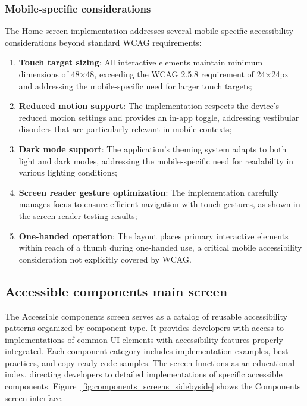 \FloatBarrier

\subsubsection{Mobile-specific considerations}

The Home screen implementation addresses several mobile-specific accessibility considerations beyond standard WCAG requirements:

\begin{enumerate}
    \item \textbf{Touch target sizing}: All interactive elements maintain minimum dimensions of 48×48, exceeding the WCAG 2.5.8 requirement of 24×24px and addressing the mobile-specific need for larger touch targets;
    \item \textbf{Reduced motion support}: The implementation respects the device's reduced motion settings and provides an in-app toggle, addressing vestibular disorders that are particularly relevant in mobile contexts;
    \item \textbf{Dark mode support}: The application's theming system adapts to both light and dark modes, addressing the mobile-specific need for readability in various lighting conditions;
    \item \textbf{Screen reader gesture optimization}: The implementation carefully manages focus to ensure efficient navigation with touch gestures, as shown in the screen reader testing results;
    \item \textbf{One-handed operation}: The layout places primary interactive elements within reach of a thumb during one-handed use, a critical mobile accessibility consideration not explicitly covered by WCAG.
\end{enumerate}

\subsection{Accessible components main screen}

The Accessible components screen serves as a catalog of reusable accessibility patterns organized by component type. It provides developers with access to implementations of common UI elements with accessibility features properly integrated. Each component category includes implementation examples, best practices, and copy-ready code samples. The screen functions as an educational index, directing developers to detailed implementations of specific accessible components. Figure~\ref{fig:components_screens_sidebyside} shows the Components screen interface.

